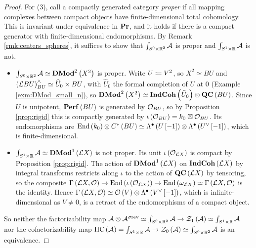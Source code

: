 \begin{proof}
For (3), call a compactly generated category \emph{proper} if all mapping complexes between
compact objects have finite-dimensional total cohomology. This is invariant under equivalence in
$\mathbf{Pr}$, and it holds if there is a compact generator with finite-dimensional endomorphisms. By
Remark \ref{rmk:centers_spheres}, it suffices to show that $\int_{S^0\times\mathbb{R}^2}\mathcal{A}$ is proper
and $\int_{S^1\times\mathbb{R}}\mathcal{A}$ is not.
\begin{itemize}
\item $\int_{S^0\times\mathbb{R}^2}\mathcal{A}\simeq\mathbf{DMod}^2\left(X^2\right)$ is proper. Write $U\coloneqq V^2$, so
$X^2\simeq BU$ and $\left(\mathcal{L} BU\right)^\wedge_{BU}\simeq\widehat U_0\times BU$, with $\widehat U_0$
the formal completion of $U$ at $0$ (Example \ref{exm:DMod_small_n}), so
$\mathbf{DMod}^2\left(X^2\right)\simeq\mathbf{IndCoh}\left(\widehat U_0\right)\otimes\mathbf{QC}\left(BU\right)$. Since $U$
is unipotent, $\mathbf{Perf}\left(BU\right)$ is generated by $\mathcal{O}_{BU}$, so by Proposition
\ref{prop:rigid} this is compactly generated by
$\iota\left(\mathcal{O}_{BU}\right)=k_0\boxtimes\mathcal{O}_{BU}$. Its endomorphisms are
$\operatorname{End}\left(k_0\right)\otimes C^*\left(BU\right)\simeq
\Lambda^\bullet\left(U\left[-1\right]\right)\otimes\Lambda^\bullet\left(U^\vee\left[-1\right]\right)$,
which is finite-dimensional.
\item $\int_{S^1\times\mathbb{R}}\mathcal{A}\simeq\mathbf{DMod}^1\left(\mathcal{L} X\right)$ is
not proper. Its unit $\iota\left(\mathcal{O}_{\mathcal{L} X}\right)$ is compact by Proposition \ref{prop:rigid}.
The action of $\mathbf{DMod}^1\left(\mathcal{L} X\right)$ on $\mathbf{IndCoh}\left(\mathcal{L} X\right)$ by integral
transforms restricts along $\iota$ to the action of $\mathbf{QC}\left(\mathcal{L} X\right)$ by tensoring, so the
composite
$\Gamma\left(\mathcal{L} X,\mathcal{O}\right)\to\operatorname{End}\left(\iota\left(\mathcal{O}_{\mathcal{L} X}\right)\right)\to
\operatorname{End}\left(\omega_{\mathcal{L} X}\right)\simeq\Gamma\left(\mathcal{L} X,\mathcal{O}\right)$ is the identity. Hence
$\Gamma\left(\mathcal{L} X,\mathcal{O}\right)\simeq\mathcal{O}\left(V\right)\otimes\Lambda^\bullet\left(V^\vee\left[-1\right]\right)$,
which is infinite-dimensional as $V\neq0$, is a retract of the endomorphisms of a compact object.
\end{itemize}
So neither the factorizability map
$\mathcal{A}\otimes\mathcal{A}^{\sigma\text{rev}}\simeq\int_{S^0\times\mathbb{R}^2}\mathcal{A}\to\mathcal{Z}_1\left(\mathcal{A}\right)\simeq\int_{S^1\times\mathbb{R}}\mathcal{A}$
nor the cofactorizability map
$\operatorname{HC}\left(\mathcal{A}\right)=\int_{S^1\times\mathbb{R}}\mathcal{A}\to\mathcal{Z}_0\left(\mathcal{A}\right)\simeq\int_{S^0\times\mathbb{R}^2}\mathcal{A}$
is an equivalence.
\end{proof}

